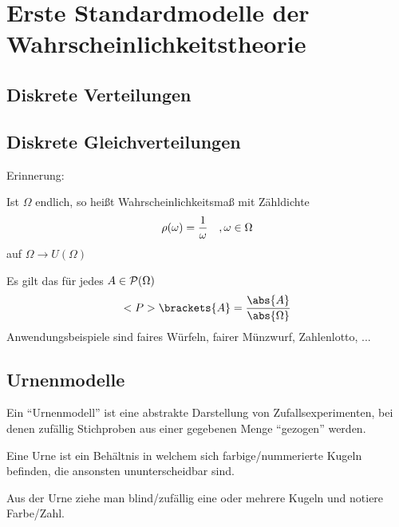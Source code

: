 \chapter{Erste Standardmodelle der Wahrscheinlichkeitstheorie}
\section*{Diskrete Verteilungen}

\section{Diskrete Gleichverteilungen}


Erinnerung:
\begin{*erinnerung}[\propref{1_10}]
	Ist $\Omega$ endlich, so heißt Wahrscheinlichkeitsmaß mit Zähldichte
	\begin{align}
		\rho(\omega) = \frac{1}{\omega}\quad, \omega \in \Omega\notag
	\end{align}
	 auf $\Omega \to U(\Omega)$
\end{*erinnerung}
Es gilt das für jedes $A \in \mathcal{P}(\Omega)$
\begin{align}
	\probp\brackets{A} = \frac{\abs{A}}{\abs{\Omega}} \notag
\end{align}
Anwendungsbeispiele sind faires Würfeln, fairer Münzwurf, Zahlenlotto, ...

\section{Urnenmodelle}

Ein ``Urnenmodell'' ist eine abstrakte Darstellung von Zufallsexperimenten, bei denen zufällig Stichproben aus einer gegebenen Menge ``gezogen'' werden.
\begin{*definition}[Urne]
	Eine Urne ist ein Behältnis in welchem sich farbige/nummerierte Kugeln befinden, die ansonsten ununterscheidbar sind.
\end{*definition}
Aus der Urne ziehe man blind/zufällig eine oder mehrere Kugeln und notiere Farbe/Zahl.


